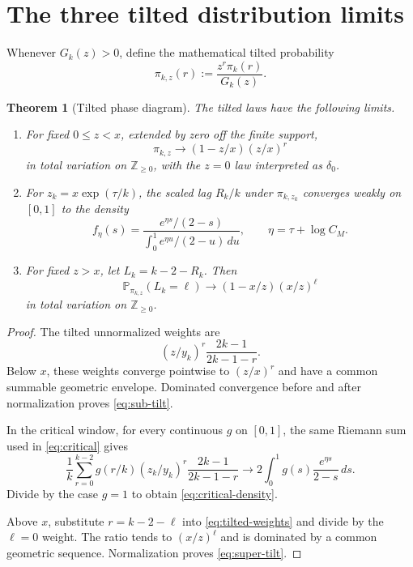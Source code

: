 \documentclass[11pt]{article}
\newtheorem{theorem}{Theorem}[section]
\theoremstyle{remark}
\begin{document}
\section{The three tilted distribution limits}

Whenever $G_k(z)>0$, define the mathematical tilted probability
\begin{equation}\label{eq:tilted}
 \pi_{k,z}(r):=\frac{z^r\pi_k(r)}{G_k(z)}.
\end{equation}

\begin{theorem}[Tilted phase diagram]\label{thm:tilted}
The tilted laws have the following limits.
\begin{enumerate}
\item For fixed $0\le z<x$, extended by zero off the finite support,
\begin{equation}\label{eq:sub-tilt}
 \pi_{k,z}\longrightarrow
 (1-z/x)(z/x)^r
\end{equation}
in total variation on $\mathbb Z_{\ge0}$, with the $z=0$ law interpreted as
$\delta_0$.
\item For $z_k=x\exp(\tau/k)$, the scaled lag $R_k/k$ under
$\pi_{k,z_k}$ converges weakly on $[0,1]$ to the density
\begin{equation}\label{eq:critical-density}
 f_\eta(s)=
 \frac{e^{\eta s}/(2-s)}
 {\displaystyle\int_0^1e^{\eta u}/(2-u)\,du},
 \qquad \eta=\tau+\log C_M.
\end{equation}
\item For fixed $z>x$, let $L_k=k-2-R_k$.  Then
\begin{equation}\label{eq:super-tilt}
 \mathbb P_{\pi_{k,z}}(L_k=\ell)
 \longrightarrow(1-x/z)(x/z)^\ell
\end{equation}
in total variation on $\mathbb Z_{\ge0}$.
\end{enumerate}
\end{theorem}

\begin{proof}
The tilted unnormalized weights are
\begin{equation}\label{eq:tilted-weights}
 (z/y_k)^r\frac{2k-1}{2k-1-r}.
\end{equation}
Below $x$, these weights converge pointwise to $(z/x)^r$ and have a common
summable geometric envelope.  Dominated convergence before and after
normalization proves \eqref{eq:sub-tilt}.

In the critical window, for every continuous $g$ on $[0,1]$, the same Riemann
sum used in \eqref{eq:critical} gives
\[
 \frac1k\sum_{r=0}^{k-2}g(r/k)
 (z_k/y_k)^r\frac{2k-1}{2k-1-r}
 \longrightarrow2\int_0^1g(s)\frac{e^{\eta s}}{2-s}\,ds.
\]
Divide by the case $g=1$ to obtain \eqref{eq:critical-density}.

Above $x$, substitute $r=k-2-\ell$ into \eqref{eq:tilted-weights} and divide by
the $\ell=0$ weight.  The ratio tends to $(x/z)^\ell$ and is dominated by a
common geometric sequence.  Normalization proves \eqref{eq:super-tilt}.
\end{proof}
\end{document}
